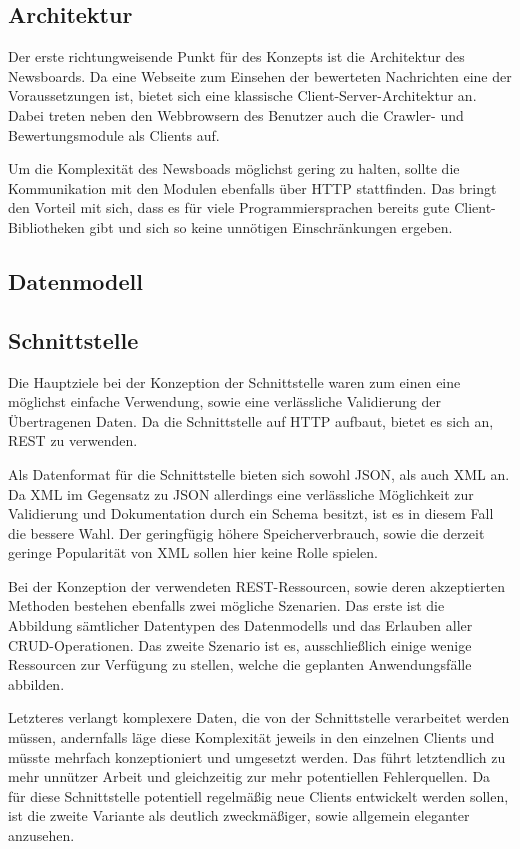\subsection{Architektur}
Der erste richtungweisende Punkt für des Konzepts ist die Architektur des Newsboards.
Da eine Webseite zum Einsehen der bewerteten Nachrichten eine der Voraussetzungen ist,
bietet sich eine klassische Client-Server-Architektur an.
Dabei treten neben den Webbrowsern des Benutzer auch die Crawler-
und Bewertungsmodule als Clients auf.

Um die Komplexität des Newsboads möglichst gering zu halten, sollte die Kommunikation
mit den Modulen ebenfalls über HTTP stattfinden. Das bringt den Vorteil mit sich,
dass es für viele Programmiersprachen bereits gute Client-Bibliotheken gibt
und sich so keine unnötigen Einschränkungen ergeben.

\subsection{Datenmodell}

\subsection{Schnittstelle}
Die Hauptziele bei der Konzeption der Schnittstelle waren zum einen eine möglichst
einfache Verwendung, sowie eine verlässliche Validierung der Übertragenen Daten.
Da die Schnittstelle auf HTTP aufbaut, bietet es sich an, REST zu verwenden.

Als Datenformat für die Schnittstelle bieten sich sowohl JSON, als auch XML an.
Da XML im Gegensatz zu JSON allerdings eine verlässliche Möglichkeit zur Validierung
und Dokumentation durch ein Schema besitzt, ist es in diesem Fall die bessere Wahl.
Der geringfügig höhere Speicherverbrauch, sowie die derzeit geringe Popularität
von XML sollen hier keine Rolle spielen.

Bei der Konzeption der verwendeten REST-Ressourcen, sowie deren akzeptierten Methoden
bestehen ebenfalls zwei mögliche Szenarien. Das erste ist die Abbildung sämtlicher
Datentypen des Datenmodells und das Erlauben aller CRUD-Operationen.
Das zweite Szenario ist es, ausschließlich einige wenige Ressourcen zur Verfügung
zu stellen, welche die geplanten Anwendungsfälle abbilden.

Letzteres verlangt komplexere Daten, die von der Schnittstelle verarbeitet werden müssen,
andernfalls läge diese Komplexität jeweils in den einzelnen Clients und müsste
mehrfach konzeptioniert und umgesetzt werden. Das führt letztendlich zu mehr
unnützer Arbeit und gleichzeitig zur mehr potentiellen Fehlerquellen.
Da für diese Schnittstelle potentiell regelmäßig neue Clients entwickelt werden sollen,
ist die zweite Variante als deutlich zweckmäßiger, sowie allgemein eleganter anzusehen.

